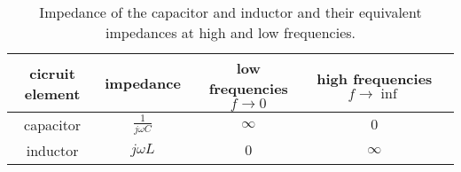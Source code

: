 \documentclass{ximera}
\begin{document}
\begin{table}[htbp]
\centering
\begin{tabular}{|c|c|c|c|c|} \hline
cicruit element & impedance & low frequencies $f \to 0$& high frequencies $f \to \inf$   \\  \hline  
 capacitor     & $\frac{1}{j \omega C}$    & $\infty$ & $0$    \\  \hline       
 inductor & $j \omega L$              &    $0$   &       $\infty $             \\ \hline
\end{tabular}
\caption{Impedance of the capacitor and inductor and their equivalent impedances at high and low frequencies.}
\end{table}
\end{document}
